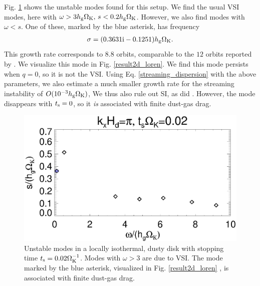 Fig. \ref{compare_eigenvals_ts0d02} shows the unstable modes found for
this setup. We find the usual VSI modes, here with $\omega> 3h_\mathrm{g}\Omega_{\rm K},\, s<
0.2h_\mathrm{g}\Omega_{\rm K}$. However, we also find modes with $\omega<s$. One of these,
marked by the blue asterisk, has 
frequency 
\begin{align*}
\sigma = (0.3631\mathrm{i} - 0.1251)h_\mathrm{g}\Omega_{\rm K}. 
\end{align*}
This growth rate corresponds to $8.8$ orbits, comparable to the $12$
orbits reported by \citeauthor{loren15}. We visualize this mode in
Fig. \ref{result2d_loren}. We find this mode 
persists when $q=0$, so it is not the VSI. 
Using Eq. \ref{streaming_dispersion} with the above parameters,  
we also estimate a much smaller growth 
rate for the streaming instability of 
$O(10^{-3}h_\mathrm{g}\Omega_{\rm K})$, We thus also rule out
SI, as did \citeauthor{loren15}. However, the mode disappears with $t_\mathrm{s}=0$, so it \emph{is}
associated with finite dust-gas drag. 

\begin{figure}
  \includegraphics[width=\linewidth]{figures/compare_eigenvals_ts0d02}
  \caption{Unstable modes in a locally isothermal, dusty disk
    with stopping time  
    $t_\mathrm{s}=0.02\Omega_{\rm K}^{-1}$. Modes with $\omega>3$ are due to
    VSI. The mode marked by the blue asterisk, visualized in
    Fig. \protect\ref{result2d_loren}
    , is associated with finite dust-gas
    drag. 
  }\label{compare_eigenvals_ts0d02}
\end{figure}


